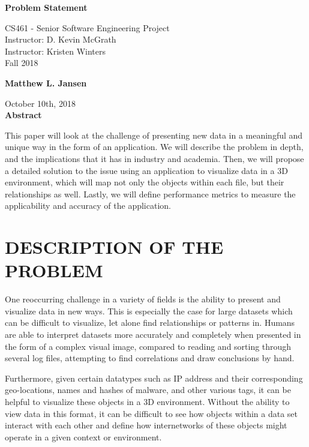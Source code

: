 \documentclass[letterpaper,10pt,titlepage, onecolumn]{IEEEtran}
\begin{document}
\begin{titlepage}
\begin{center}
  
  \textbf{}

  \vspace{6cm}
  \Huge{}
  \textbf{Problem Statement}
  \vspace{3cm}

 
  \LARGE
  CS461 - Senior Software Engineering Project\\
  \vspace{0.25cm}
  Instructor: D. Kevin McGrath \\
  Instructor: Kristen Winters \\
  \vspace{0.25cm}
  Fall 2018 \\
  \vspace{1.5cm}
  
  \textbf{Matthew L. Jansen}
  \date{October 10th, 2018}
  \vfill
  October 10th, 2018\\
  \vspace{1cm}
  \vspace*{\fill}
  \textbf{Abstract}
  \end{center}
This paper will look at the challenge of presenting new data in a meaningful and unique way in the form of an application. We will describe the problem in depth, and the implications that it has in industry and academia. Then, we will propose a detailed solution to the issue using an application to visualize data in a 3D environment, which will map not only the objects within each file, but their relationships as well. Lastly, we will define performance metrics to measure the applicability and accuracy of the application.
  \end{titlepage}
  
\section*{DESCRIPTION OF THE PROBLEM}
One reoccurring challenge in a variety of fields is the ability to present and visualize data in new ways. This is especially the case for large datasets which can be difficult to visualize, let alone find relationships or patterns in. Humans are able to interpret datasets more accurately and completely when presented in the form of a complex visual image, compared to reading and sorting through several log files, attempting to find correlations and draw conclusions by hand. 

Furthermore, given certain datatypes such as IP address and their corresponding geo-locations, names and hashes of malware, and other various tags, it can be helpful to visualize these objects in a 3D environment. Without the ability to view data in this format, it can be difficult to see how objects within a data set interact with each other and define how internetworks of these objects might operate in a given context or environment.
\end{document}
